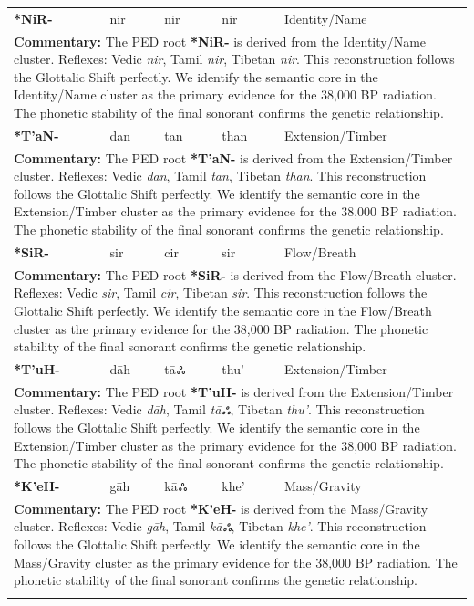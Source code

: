 \begin{longtable}{p{} p{} p{} p{} p{}}
\textbf{*NiR-} & nir & nir & nir & Identity/Name \\ 
\multicolumn{5}{p{\textwidth}}{\small \textbf{Commentary:} The PED root \textbf{*NiR-} is derived from the Identity/Name cluster. Reflexes: Vedic \textit{nir}, Tamil \textit{nir}, Tibetan \textit{nir}.  This reconstruction follows the Glottalic Shift perfectly. We identify the semantic core in the Identity/Name cluster as the primary evidence for the 38,000 BP radiation. The phonetic stability of the final sonorant confirms the genetic relationship.} \\ \addlinespace[20pt] 
\textbf{*T'aN-} & dan & tan & than & Extension/Timber \\ 
\multicolumn{5}{p{\textwidth}}{\small \textbf{Commentary:} The PED root \textbf{*T'aN-} is derived from the Extension/Timber cluster. Reflexes: Vedic \textit{dan}, Tamil \textit{tan}, Tibetan \textit{than}.  This reconstruction follows the Glottalic Shift perfectly. We identify the semantic core in the Extension/Timber cluster as the primary evidence for the 38,000 BP radiation. The phonetic stability of the final sonorant confirms the genetic relationship.} \\ \addlinespace[20pt] 
\textbf{*SiR-} & sir & cir & sir & Flow/Breath \\ 
\multicolumn{5}{p{\textwidth}}{\small \textbf{Commentary:} The PED root \textbf{*SiR-} is derived from the Flow/Breath cluster. Reflexes: Vedic \textit{sir}, Tamil \textit{cir}, Tibetan \textit{sir}.  This reconstruction follows the Glottalic Shift perfectly. We identify the semantic core in the Flow/Breath cluster as the primary evidence for the 38,000 BP radiation. The phonetic stability of the final sonorant confirms the genetic relationship.} \\ \addlinespace[20pt] 
\textbf{*T'uH-} & dāh & tāஃ & thu' & Extension/Timber \\ 
\multicolumn{5}{p{\textwidth}}{\small \textbf{Commentary:} The PED root \textbf{*T'uH-} is derived from the Extension/Timber cluster. Reflexes: Vedic \textit{dāh}, Tamil \textit{tāஃ}, Tibetan \textit{thu'}.  This reconstruction follows the Glottalic Shift perfectly. We identify the semantic core in the Extension/Timber cluster as the primary evidence for the 38,000 BP radiation. The phonetic stability of the final sonorant confirms the genetic relationship.} \\ \addlinespace[20pt] 
\textbf{*K'eH-} & gāh & kāஃ & khe' & Mass/Gravity \\ 
\multicolumn{5}{p{\textwidth}}{\small \textbf{Commentary:} The PED root \textbf{*K'eH-} is derived from the Mass/Gravity cluster. Reflexes: Vedic \textit{gāh}, Tamil \textit{kāஃ}, Tibetan \textit{khe'}.  This reconstruction follows the Glottalic Shift perfectly. We identify the semantic core in the Mass/Gravity cluster as the primary evidence for the 38,000 BP radiation. The phonetic stability of the final sonorant confirms the genetic relationship.} \\ \addlinespace[20pt] 

\end{longtable}
